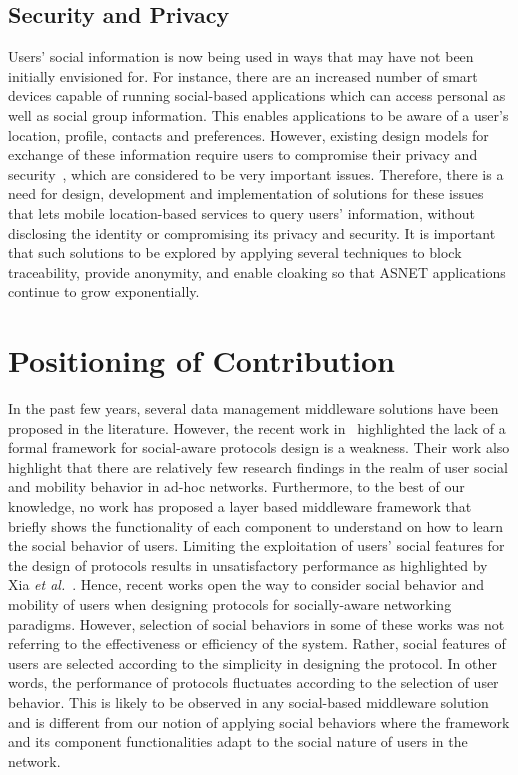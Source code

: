 \subsection{Security and Privacy}\label{Chap2_07_05}
Users' social information is now being used in ways that may have not been initially envisioned for. For instance, there are an increased number of smart devices capable of running social-based applications which can access personal as well as social group information. This enables applications to be aware of a user's location, profile, contacts and preferences. However, existing design models for exchange of these information require users to compromise their privacy and security~\cite{AMohaien2013}, which are considered to be very important issues. Therefore, there is a need for design, development and implementation of solutions for these issues that lets mobile location-based services to query users' information, without disclosing the identity or compromising its privacy and security. It is important that such solutions to be explored by applying several techniques to block traceability, provide anonymity, and enable cloaking so that ASNET applications continue to grow exponentially.

\section{Positioning of Contribution}\label{Chap2_08}
In the past few years, several data management middleware solutions have been proposed in the literature. However, the recent work in~\cite{NVastardis2013} highlighted the lack of a formal framework for social-aware protocols design is a weakness. Their work also highlight that there are relatively few research findings in the realm of user social and mobility behavior in ad-hoc networks. Furthermore, to the best of our knowledge, no work has proposed a layer based middleware framework that briefly shows the functionality of each component to understand on how to learn the social behavior of users. Limiting the exploitation of users' social features for the design of protocols results in unsatisfactory performance as highlighted by Xia {\it et al.}~\cite{FXia2013}. Hence, recent works open the way to consider social behavior and mobility of users when designing protocols for socially-aware networking paradigms.  However, selection of social behaviors in some of these works was not referring to the effectiveness or efficiency of the system. Rather, social features of users are selected according to the simplicity in designing the protocol. In other words, the performance of protocols fluctuates according to the selection of user behavior. This is likely to be observed in any social-based middleware solution and is different from our notion of applying social behaviors where the framework and its component functionalities adapt to the social nature of users in the network.

